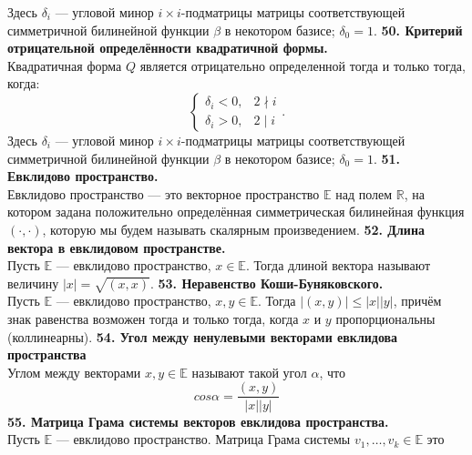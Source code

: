 \documentclass{article}
\begin{document}
Здесь $\delta_i$ --- угловой минор $i\times i$-подматрицы матрицы соответствующей симметричной билинейной функции $\beta$ в некотором базисе; $\delta_0 = 1$.
\newline
\newline
\textbf{50. Критерий отрицательной определённости квадратичной формы.}\\
Квадратичная форма $Q$ является отрицательно определенной тогда и только тогда,\\ когда:
$$
\begin{cases}
	\delta_i < 0, & 2 \nmid i \\
	\delta_i > 0, & 2 \mid i
\end{cases}.
$$
Здесь $\delta_i$ --- угловой минор $i\times i$-подматрицы матрицы соответствующей симметричной билинейной функции $\beta$ в некотором базисе; $\delta_0 = 1$.
\newline
\newline
\textbf{51. Евклидово пространство.}\\
Евклидово пространство --- это векторное пространство $\mathbb{E}$ над полем $\mathbb{R}$, на котором задана положительно определённая симметрическая билинейная функция $(\cdot, \cdot)$, которую мы будем называть скалярным произведением.
\newline
\newline
\textbf{52. Длина вектора в евклидовом пространстве.}\\
Пусть $\mathbb{E}$ --- евклидово пространство, $x\in \mathbb{E}$. Тогда длиной вектора называют величину $|x| = \sqrt{(x,x)}$.
\newline
\newline
\textbf{53. Неравенство Коши-Буняковского.}\\
Пусть $\mathbb{E}$ --- евклидово пространство, $x, y \in \mathbb{E}$. Тогда $|(x,y)| \leqslant |x||y|$, причём знак равенства возможен тогда и только тогда, когда $x$ и $y$ пропорциональны (коллинеарны).
\newline
\newline
\textbf{54. Угол между ненулевыми векторами евклидова пространства}\\
Углом между векторами $x,y\in \mathbb{E}$ называют такой угол $\alpha$, что 
$$cos\alpha=\frac{(x,y)}{|x||y|}$$
\newline
\newline
\textbf{55. Матрица Грама системы векторов евклидова пространства.}\\
Пусть $\mathbb{E}$ --- евклидово пространство.
Матрица Грама системы $v_1, \ldots, v_k \in \mathbb{E}$ это
\end{document}
